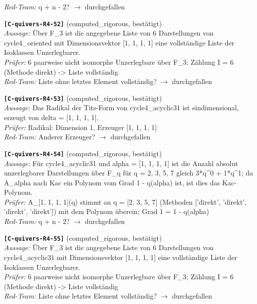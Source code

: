\documentclass[11pt]{article}
\theoremstyle{definition}\newtheorem{definition}[theorem]{Definition}\newtheorem{remark}[theorem]{Remark}\newtheorem{observation}[theorem]{Numerical observation}
\begin{document}
\textit{Red-Team:} q + n - 2? $\to$ durchgefallen\par\medskip
\noindent\textbf{\texttt{[C-quivers-R4-52]}} (computed\_rigorous, bestätigt)\\
\textit{Aussage:} Über F\_3 ist die angegebene Liste von 6 Darstellungen von cycle4\_oriented mit Dimensionsvektor [1, 1, 1, 1] eine vollständige Liste der Isoklassen Unzerlegbarer.\\
\textit{Prüfer:} 6 paarweise nicht isomorphe Unzerlegbare über F\_3; Zählung I = 6 (Methode direkt) -> Liste vollständig\\
\textit{Red-Team:} Liste ohne letztes Element vollständig? $\to$ durchgefallen\par\medskip
\noindent\textbf{\texttt{[C-quivers-R4-53]}} (computed\_rigorous, bestätigt)\\
\textit{Aussage:} Das Radikal der Tits-Form von cycle4\_acyclic31 ist eindimensional, erzeugt von delta = [1, 1, 1, 1].\\
\textit{Prüfer:} Radikal: Dimension 1, Erzeuger [1, 1, 1, 1]\\
\textit{Red-Team:} Anderer Erzeuger? $\to$ durchgefallen\par\medskip
\noindent\textbf{\texttt{[C-quivers-R4-54]}} (computed\_rigorous, bestätigt)\\
\textit{Aussage:} Für cycle4\_acyclic31 und alpha = [1, 1, 1, 1] ist die Anzahl absolut unzerlegbarer Darstellungen über F\_q für q = 2, 3, 5, 7 gleich 3*q\textasciicircum{}0 + 1*q\textasciicircum{}1; da A\_alpha nach Kac ein Polynom vom Grad 1 - q(alpha) ist, ist dies das Kac-Polynom.\\
\textit{Prüfer:} A\_[1, 1, 1, 1](q) stimmt an q = [2, 3, 5, 7] (Methoden ['direkt', 'direkt', 'direkt', 'direkt']) mit dem Polynom überein; Grad 1 = 1 - q(alpha)\\
\textit{Red-Team:} q + n - 2? $\to$ durchgefallen\par\medskip
\noindent\textbf{\texttt{[C-quivers-R4-55]}} (computed\_rigorous, bestätigt)\\
\textit{Aussage:} Über F\_3 ist die angegebene Liste von 6 Darstellungen von cycle4\_acyclic31 mit Dimensionsvektor [1, 1, 1, 1] eine vollständige Liste der Isoklassen Unzerlegbarer.\\
\textit{Prüfer:} 6 paarweise nicht isomorphe Unzerlegbare über F\_3; Zählung I = 6 (Methode direkt) -> Liste vollständig\\
\textit{Red-Team:} Liste ohne letztes Element vollständig? $\to$ durchgefallen\par\medskip
\end{document}
